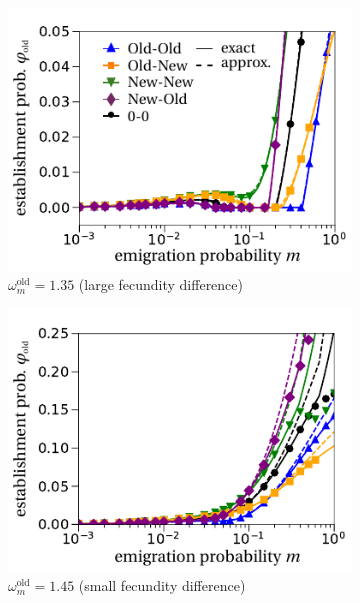 \documentclass[a4paper,11pt]{scrartcl}
\begin{document}
\begin{figure}[t!]
	\centering
	\begin{subfigure}{.5\textwidth}
  		\centering
  		\includegraphics[width=\linewidth]{fig2a.pdf}
  		\caption{$\omega^\text{old}_m=1.35$ (large fecundity difference)}
	\end{subfigure}%
	\begin{subfigure}{.5\textwidth}
 		 \centering
 		 \includegraphics[width=\linewidth]{fig2c.pdf}
  	\caption{$\omega^\text{old}_m=1.45$ (small fecundity difference)}
	\end{subfigure}
	\begin{subfigure}{.5\textwidth}
  		\centering

\end{subfigure}
\end{figure}
\end{document}
